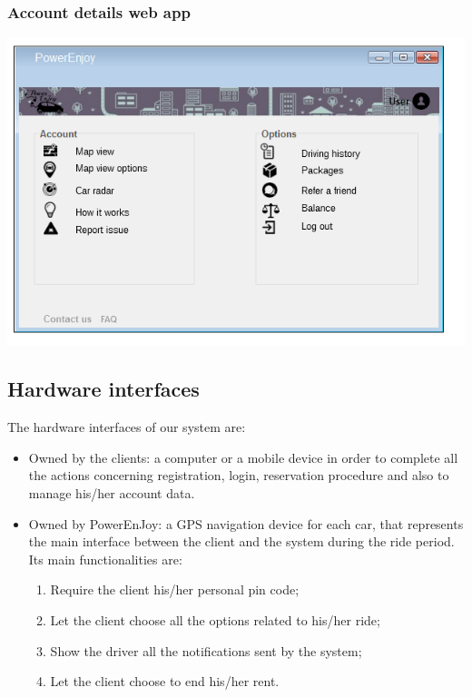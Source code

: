 \clearpage
\subsubsection{Account details web app}
\begin{center}
\includegraphics[]{../images/mookup/Account_web}
\end{center}




\subsection{Hardware interfaces}
The hardware interfaces of our system are:
\begin{itemize}
\item Owned by the clients: a computer or a mobile device in order to complete all the actions concerning registration, login, reservation procedure and also to manage his/her account data.
\item Owned by PowerEnJoy: a GPS navigation device for each car, that represents the main interface between the client and the system during the ride period.
Its main functionalities are:
\begin{enumerate}
\item Require the client his/her personal pin code;
\item Let the client choose all the options related to his/her ride;
\item Show the driver all the notifications sent by the system;
\item Let the client choose to end his/her rent.
\end{enumerate}
\end{itemize}
